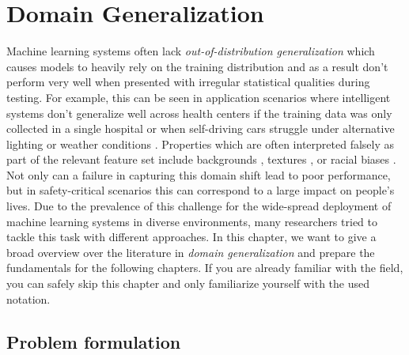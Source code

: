 \chapter{Domain Generalization} %
\label{DomainGeneralization} 

Machine learning systems often lack \emph{out-of-distribution generalization} which causes models to heavily rely on the training distribution and as a result don't perform very well when presented with irregular statistical qualities during testing. For example, this can be seen in application scenarios where intelligent systems don't generalize well across health centers if the training data was only collected in a single hospital \citep{Castro_2020, AlBadawy2018, PeroneBBC19} or when self-driving cars struggle under alternative lighting or weather conditions \citep{DaiG18, VolkMBH019}. Properties which are often interpreted falsely as part of the relevant feature set include backgrounds \citep{BeeryHP18}, textures \citep{GeirhosRMBWB19}, or racial biases \citep{StockC18}. Not only can a failure in capturing this domain shift lead to poor performance, but in safety-critical scenarios this can correspond to a large impact on people's lives. Due to the prevalence of this challenge for the wide-spread deployment of machine learning systems in diverse environments, many researchers tried to tackle this task with different approaches. In this chapter, we want to give a broad overview over the literature in \emph{domain generalization} and prepare the fundamentals for the following chapters. If you are already familiar with the field, you can safely skip this chapter and only familiarize yourself with the used notation.

\section{Problem formulation}
\label{sec:domain_gen_problem}

